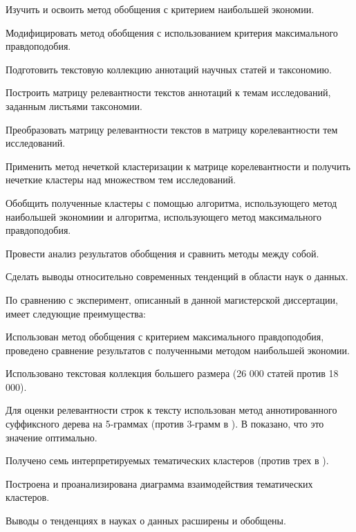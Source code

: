 \documentclass[12pt]{article}
\newenvironment{itemize*}%
{\begin{itemize}%
	\setlength{\itemsep}{0pt}%
	\setlength{\parskip}{0pt}}%
{\end{itemize}}
\begin{document}
\begin{itemize*}
	\item Изучить и освоить метод обобщения с критерием наибольшей экономии.
	\item Модифицировать метод обобщения с использованием критерия максимального правдоподобия.
	\item Подготовить текстовую коллекцию аннотаций научных статей и таксономию.
	\item Построить матрицу релевантности текстов аннотаций к темам исследований, заданным листьями таксономии.
	\item Преобразовать матрицу релевантности текстов в матрицу корелевантности тем исследований.
	\item Применить метод нечеткой кластеризации к матрице корелевантности и получить нечеткие кластеры над множеством тем исследований.
	\item Обобщить полученные кластеры с помощью алгоритма, использующего метод наибольшей экономиии и алгоритма, использующего метод максимального правдоподобия.
	\item Провести анализ результатов обобщения и сравнить методы между собой.
	\item Сделать выводы относительно современных тенденций в области наук о данных.
\end{itemize*}

По сравнению с \cite{mirkin2018preprint} эксперимент, описанный в данной магистерской диссертации, имеет следующие преимущества:

\begin{itemize*}
	\item Использован метод обобщения с критерием максимального правдоподобия, проведено сравнение результатов с полученными методом наибольшей экономии.
	\item Использовано текстовая коллекция большего размера (26 000 статей против 18 000).
	\item  Для оценки релевантности строк к тексту использован метод аннотированного суффиксного дерева на 5-граммах (против 3-грамм в \cite{mirkin2018preprint}). В \cite{Chernyak_2015} показано, что это значение оптимально.
	\item Получено семь интерпретируемых тематических кластеров (против трех в \cite{mirkin2018preprint}).
	\item Построена и проанализирована диаграмма взаимодействия тематических кластеров.
	\item Выводы о тенденциях в науках о данных расширены и обобщены.
\end{itemize*}
\end{document}

